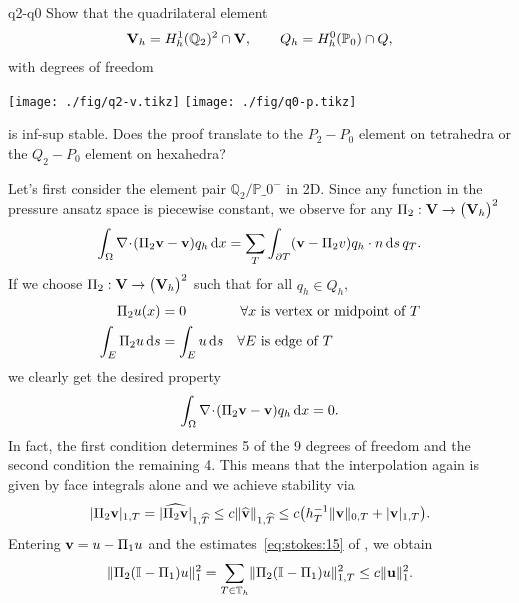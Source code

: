 \begin{Problem}{q2-q0}
  Show that the quadrilateral element
  \begin{gather}
    \mathbf V_h = H^1_h(\mathbb Q_2)^2\cap \mathbf V,
    \qquad Q_h = H^0_h(\mathbb P_0) \cap Q,
  \end{gather}
  with degrees of freedom
  \begin{center}
    \texttt{[image: ./fig/q2-v.tikz]}
    \hspace{1cm}
    \texttt{[image: ./fig/q0-p.tikz]}
  \end{center}
  is inf-sup stable. Does the proof translate to the $P_2-P_0$ element
  on tetrahedra or the $Q_2-P_0$ element on hexahedra?
\begin{solution}
  Let's first consider the element pair $\mathbb{Q}_2/\mathbb{P}\_0^-$ in 2D.
  Since any function in the pressure ansatz space is piecewise constant, we observe
  for any $\Pi_2: \mathbf V \to \bigl(\mathbf V_h\bigr)^2$
  \begin{align}
    \int_\Omega \nabla\!\cdot\!(\Pi_2 \mathbf v-\mathbf v) q_h \,\mathrm{d} x
    = \sum_T\int_{\partial T} (\mathbf v-\Pi_2v)q_h \cdot n \,\mathrm{d} s \,q_T.
  \end{align}
  If we choose $\Pi_2: \mathbf V \to \bigl(\mathbf V_h\bigr)^2$ such that for all $q_h\in Q_h$,
  \begin{align}
    \Pi_2 u(x) &= 0
    & \forall x &\text{ is vertex or midpoint of } T\\
    \int_E \Pi_2 u\,\mathrm{d} s &= \int_E u\,\mathrm{d} s
    & \forall E &\text{ is edge of } T
  \end{align}
  we clearly get the desired property
  \begin{align}
    \int_\Omega \nabla\!\cdot\!(\Pi_2 \mathbf v-\mathbf v) q_h \,\mathrm{d} x = 0.
  \end{align}
  In fact, the first condition determines 5 of the 9 degrees of freedom
  and the second condition the remaining 4. This means that the interpolation
  again is given by face integrals alone and we achieve stability via
  \begin{align}
    \lvert\Pi_2 \mathbf v\rvert_{1,T}
    =\lvert\widehat{\Pi_2 \mathbf v}\rvert_{1,\widehat{T}}
    \le c \lVert\widehat {\mathbf v}\rVert_{1,\widehat{T}}
    \le c \bigl(h_T^{-1} \lVert\mathbf v\rVert_{0,T} + \lvert\mathbf v\rvert_{1,T}\bigr).
  \end{align}
  Entering $\mathbf v=u-\Pi_1 u$ and the estimates~\eqref{eq:stokes:15} of
  , we obtain
  \begin{align}
    \lVert\Pi_2 (\mathbb I-\Pi_1)u\rVert_1^2
    = \sum_{T\in\mathbb T_h}\lVert\Pi_2
      (\mathbb I-\Pi_1)u\rVert_{1,T}^2
    \le c \lVert\mathbf u\rVert_1^2.
  \end{align}


\end{solution}
\end{Problem}
